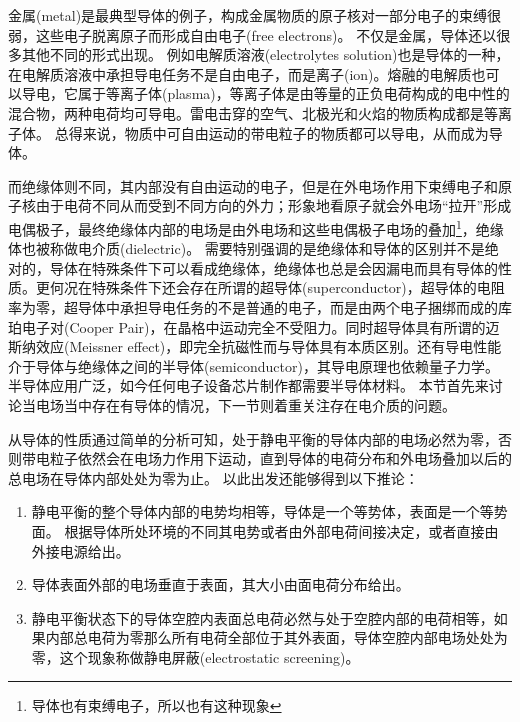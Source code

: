 {\heiti 金属}(metal)是最典型导体的例子，构成金属物质的原子核对一部分电子的束缚很弱，这些电子脱离原子而形成{\heiti 自由电子}(free electrons)。
不仅是金属，导体还以很多其他不同的形式出现。
例如{\heiti 电解质溶液}(electrolytes solution)也是导体的一种，在电解质溶液中承担导电任务不是自由电子，而是{\heiti 离子}(ion)。熔融的电解质也可以导电，它属于{\heiti 等离子体}(plasma)，等离子体是由等量的正负电荷构成的电中性的混合物，两种电荷均可导电。雷电击穿的空气、北极光和火焰的物质构成都是等离子体。
总得来说，物质中可自由运动的带电粒子的物质都可以导电，从而成为导体。

而绝缘体则不同，其内部没有自由运动的电子，但是在外电场作用下束缚电子和原子核由于电荷不同从而受到不同方向的外力；形象地看原子就会外电场“拉开”形成电偶极子，最终绝缘体内部的电场是由外电场和这些电偶极子电场的叠加\footnote{导体也有束缚电子，所以也有这种现象}，绝缘体也被称做{\heiti 电介质}(dielectric)。
需要特别强调的是绝缘体和导体的区别并不是绝对的，导体在特殊条件下可以看成绝缘体，绝缘体也总是会因漏电而具有导体的性质。更何况在特殊条件下还会存在所谓的{\heiti 超导体}(superconductor)，超导体的电阻率为零，超导体中承担导电任务的不是普通的电子，而是由两个电子捆绑而成的{\heiti 库珀电子对}(Cooper Pair)，在晶格中运动完全不受阻力。同时超导体具有所谓的{\heiti 迈斯纳效应}(Meissner effect)，即完全抗磁性而与导体具有本质区别。还有导电性能介于导体与绝缘体之间的{\heiti 半导体}(semiconductor)，其导电原理也依赖量子力学。半导体应用广泛，如今任何电子设备芯片制作都需要半导体材料。
本节首先来讨论当电场当中存在有导体的情况，下一节则着重关注存在电介质的问题。


从导体的性质通过简单的分析可知，处于静电平衡的导体内部的电场必然为零，否则带电粒子依然会在电场力作用下运动，直到导体的电荷分布和外电场叠加以后的总电场在导体内部处处为零为止。
以此出发还能够得到以下推论：
\begin{enumerate}
\item 静电平衡的整个导体内部的电势均相等，导体是一个等势体，表面是一个等势面。
根据导体所处环境的不同其电势或者由外部电荷间接决定，或者直接由外接电源给出。
\item 
导体表面外部的电场垂直于表面，其大小由面电荷分布给出。
\item 静电平衡状态下的导体空腔内表面总电荷必然与处于空腔内部的电荷相等，如果内部总电荷为零那么所有电荷全部位于其外表面，导体空腔内部电场处处为零，这个现象称做{\heiti 静电屏蔽}(electrostatic screening)。
\end{enumerate}



